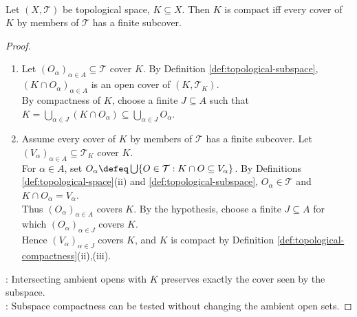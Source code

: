 \begin{proposition} \label{prop:compact-subspace-ambient-cover-equivalence} \\
Let $(X,\mathcal{T})$ be topological space, $K\subseteq X$. Then $K$ is compact iff every cover of $K$ by members of $\mathcal{T}$ has a finite subcover.
\begin{proof}
\begin{enumerate}[label=\roman*.]
\setlength{\itemsep}{0pt}
\item[$(\Rightarrow)$] Let $(O_\alpha)_{\alpha\in A}\subseteq\mathcal{T}$ cover $K$. By Definition \ref{def:topological-subspace}, $(K\cap O_\alpha)_{\alpha\in A}$ is an open cover of $(K,\mathcal{T}_K)$.\\
By compactness of $K$, choose a finite $J\subseteq A$ such that $K=\bigcup\limits_{\alpha\in J}(K\cap O_\alpha)\subseteq\bigcup\limits_{\alpha\in J}O_\alpha$.
\item[$(\Leftarrow)$] Assume every cover of $K$ by members of $\mathcal{T}$ has a finite subcover. Let $(V_\alpha)_{\alpha\in A}\subseteq\mathcal{T}_K$ cover $K$.\\
For $\alpha\in A$, set $O_\alpha\defeq\bigcup\limits\{O\in\mathcal{T}:K\cap O\subseteq V_\alpha\}$. By Definitions \ref{def:topological-space}(ii) and \ref{def:topological-subspace}, $O_\alpha\in\mathcal{T}$ and $K\cap O_\alpha=V_\alpha$.\\
Thus $(O_\alpha)_{\alpha\in A}$ covers $K$. By the hypothesis, choose a finite $J\subseteq A$ for which $(O_\alpha)_{\alpha\in J}$ covers $K$.\\
Hence $(V_\alpha)_{\alpha\in J}$ covers $K$, and $K$ is compact by Definition \ref{def:topological-compactness}(ii),(iii).
\end{enumerate}
: Intersecting ambient opens with $K$ preserves exactly the cover seen by the subspace.\\
: Subspace compactness can be tested without changing the ambient open sets.
\end{proof}
\end{proposition}

